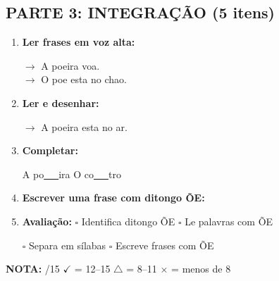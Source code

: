 \begin{exercicio}
\subsection*{PARTE 3: INTEGRAÇÃO (5 itens)}

\begin{enumerate}[resume]
  \item \textbf{Ler frases em voz alta:}
  \begin{center}
  $\rightarrow$ A poeira voa.\\
  $\rightarrow$ O poe esta no chao.
  \end{center}

  \item \textbf{Ler e desenhar:}
  \begin{center}
  $\rightarrow$ A poeira esta no ar.
  \end{center}
  \begin{center}
  \end{center}

  \item \textbf{Completar:}
  \begin{center}
  A po\underline{~~~}ira \quad O co\underline{~~~}tro
  \end{center}

  \item \textbf{Escrever uma frase com ditongo \~OE:}
  \begin{center}
  \underline{\hspace{12cm}}
  \end{center}

  \item \textbf{Avaliação:} $\square$ Identifica ditongo \~OE \quad $\square$ Le palavras com \~OE
  \begin{center}
  $\square$ Separa em sílabas \quad $\square$ Escreve frases com \~OE
  \end{center}
\end{enumerate}

\noindent\textbf{NOTA:} \underline{\hspace{1cm}}/15 \quad $\checkmark$ = 12--15 \quad $\triangle$ = 8--11 \quad $\times$ = menos de 8
\end{exercicio}


